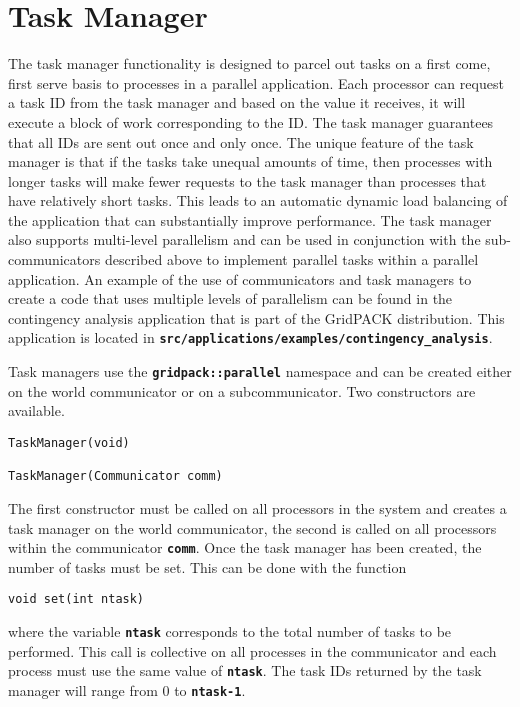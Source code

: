 \section{Task Manager}

The task manager functionality is designed to parcel out tasks on a first come,
first serve basis to processes in a parallel application. Each processor can
request a task ID from the task manager and based on the value it receives, it
will execute a block of work corresponding to the ID. The task manager
guarantees that all IDs are sent out once and only once. The unique feature of
the task manager is that if the tasks take unequal amounts of time, then
processes with longer tasks will make fewer requests to the task manager than
processes that have relatively short tasks. This leads to an automatic dynamic
load balancing of the application that can substantially improve performance.
The task manager also supports multi-level parallelism and can be used in
conjunction with the sub-communicators described above to implement parallel
tasks within a parallel application. An example of the use of communicators and
task managers to create a code that uses multiple levels of parallelism can be
found in the contingency analysis application that is part of the GridPACK
distribution. This application is located in
\texttt{\textbf{src/applications/examples/contingency\_analysis}}.

Task managers use the \texttt{\textbf{gridpack::parallel}} namespace and can be created either on the world communicator or on a subcommunicator. Two constructors are available.

{
\color{red}
\begin{Verbatim}[fontseries=b]
TaskManager(void)

TaskManager(Communicator comm)
\end{Verbatim}
}

The first constructor must be called on all processors in the system and creates a task manager on the world communicator, the second is called on all processors within the communicator \texttt{\textbf{comm}}. Once the task manager has been created, the number of tasks must be set. This can be done with the function

{
\color{red}
\begin{Verbatim}[fontseries=b]
void set(int ntask)
\end{Verbatim}
}

where the variable \texttt{\textbf{ntask}} corresponds to the total number of
tasks to be performed. This call is collective on all processes in the
communicator and each process must use the same value of
\texttt{\textbf{ntask}}. The task IDs returned by the task manager will range
from 0 to \texttt{\textbf{ntask-1}}.

